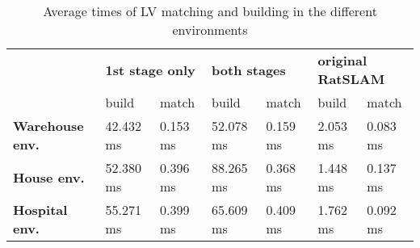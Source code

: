 \begin{table}[htpb]
    \caption{Average times of LV matching and building in the different environments}\label{tab:averageTimes}
    \centering
    \begin{tabular}{l | l  l| l l| l l}
        \toprule
        \textbf{}               & \multicolumn{2}{l|}{\textbf{1st stage only}} & \multicolumn{2}{l|}{\textbf{both stages}} & \multicolumn{2}{l}{\textbf{original RatSLAM}}                                  \\
        {}                      & build                                        & match                                     & build                                         & match    & build    & match    \\
        \hline
        \textbf{Warehouse env.} & 42.432 ms                                    & 0.153 ms                                  & 52.078 ms                                     & 0.159 ms & 2.053 ms & 0.083 ms \\
        \textbf{House env.}     & 52.380 ms                                    & 0.396 ms                                  & 88.265 ms                                     & 0.368 ms & 1.448 ms & 0.137 ms \\
        \textbf{Hospital env.}  & 55.271 ms                                    & 0.399 ms                                  & 65.609 ms                                     & 0.409 ms & 1.762 ms & 0.092 ms \\
        \bottomrule
    \end{tabular}
\end{table}


